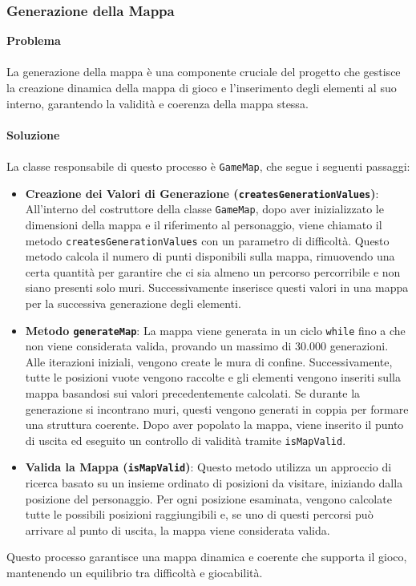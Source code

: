 \documentclass[12pt, letterpaper]{article}
\begin{document}
        \subsubsection{Generazione della Mappa}
            \textbf{Problema} 
            \\ \\
            La generazione della mappa è una componente cruciale del progetto che gestisce la creazione dinamica della mappa di gioco e l'inserimento degli elementi al suo interno, garantendo la validità e coerenza della mappa stessa. 
            \\ \\
            \textbf{Soluzione} 
            \\ \\
            La classe responsabile di questo processo è \texttt{GameMap}, che segue i seguenti passaggi:
            \begin{itemize}
                \item \textbf{Creazione dei Valori di Generazione (\texttt{createsGenerationValues})}: All'interno del costruttore della classe \texttt{GameMap}, dopo aver inizializzato le dimensioni della mappa e il riferimento al personaggio, viene chiamato il metodo \texttt{createsGenerationValues} con un parametro di difficoltà. Questo metodo calcola il numero di punti disponibili sulla mappa, rimuovendo una certa quantità per garantire che ci sia almeno un percorso percorribile e non siano presenti solo muri. Successivamente inserisce questi valori in una mappa per la successiva generazione degli elementi.
                \item \textbf{Metodo \texttt{generateMap}}: La mappa viene generata in un ciclo \texttt{while} fino a che non viene considerata valida, provando un massimo di 30.000 generazioni. Alle iterazioni iniziali, vengono create le mura di confine. Successivamente, tutte le posizioni vuote vengono raccolte e gli elementi vengono inseriti sulla mappa basandosi sui valori precedentemente calcolati. Se durante la generazione si incontrano muri, questi vengono generati in coppia per formare una struttura coerente. Dopo aver popolato la mappa, viene inserito il punto di uscita ed eseguito un controllo di validità tramite \texttt{isMapValid}.
                \item \textbf{Valida la Mappa (\texttt{isMapValid})}: Questo metodo utilizza un approccio di ricerca basato su un insieme ordinato di posizioni da visitare, iniziando dalla posizione del personaggio. Per ogni posizione esaminata, vengono calcolate tutte le possibili posizioni raggiungibili e, se uno di questi percorsi può arrivare al punto di uscita, la mappa viene considerata valida.
            \end{itemize}
            Questo processo garantisce una mappa dinamica e coerente che supporta il gioco, mantenendo un equilibrio tra difficoltà e giocabilità.
\end{document}

